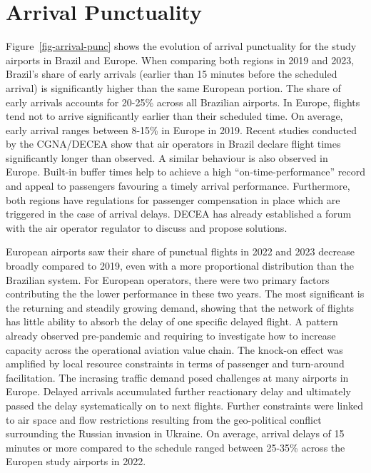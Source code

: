 \documentclass[
  a4paper,
  DIV=11,
  numbers=noendperiod]{scrreport}
\begin{document}
\hypertarget{arrival-punctuality}{%
\section{Arrival Punctuality}\label{arrival-punctuality}}

Figure~\ref{fig-arrival-punc} shows the evolution of arrival punctuality
for the study airports in Brazil and Europe. When comparing both regions
in 2019 and 2023, Brazil's share of early arrivals (earlier than 15
minutes before the scheduled arrival) is significantly higher than the
same European portion. The share of early arrivals accounts for 20-25\%
across all Brazilian airports. In Europe, flights tend not to arrive
significantly earlier than their scheduled time. On average, early
arrival ranges between 8-15\% in Europe in 2019. Recent studies
conducted by the CGNA/DECEA show that air operators in Brazil declare
flight times significantly longer than observed. A similar behaviour is
also observed in Europe. Built-in buffer times help to achieve a high
``on-time-performance'' record and appeal to passengers favouring a
timely arrival performance. Furthermore, both regions have regulations
for passenger compensation in place which are triggered in the case of
arrival delays. DECEA has already established a forum with the air
operator regulator to discuss and propose solutions.

European airports saw their share of punctual flights in 2022 and 2023
decrease broadly compared to 2019, even with a more proportional
distribution than the Brazilian system. For European operators, there
were two primary factors contributing the the lower performance in these
two years. The most significant is the returning and steadily growing
demand, showing that the network of flights has little ability to absorb
the delay of one specific delayed flight. A pattern already observed
pre-pandemic and requiring to investigate how to increase capacity
across the operational aviation value chain. The knock-on effect was
amplified by local resource constraints in terms of passenger and
turn-around facilitation. The incrasing traffic demand posed challenges
at many airports in Europe. Delayed arrivals accumulated further
reactionary delay and ultimately passed the delay systematically on to
next flights. Further constraints were linked to air space and flow
restrictions resulting from the geo-political conflict surrounding the
Russian invasion in Ukraine. On average, arrival delays of 15 minutes or
more compared to the schedule ranged between 25-35\% across the Europen
study airports in 2022.
\end{document}
